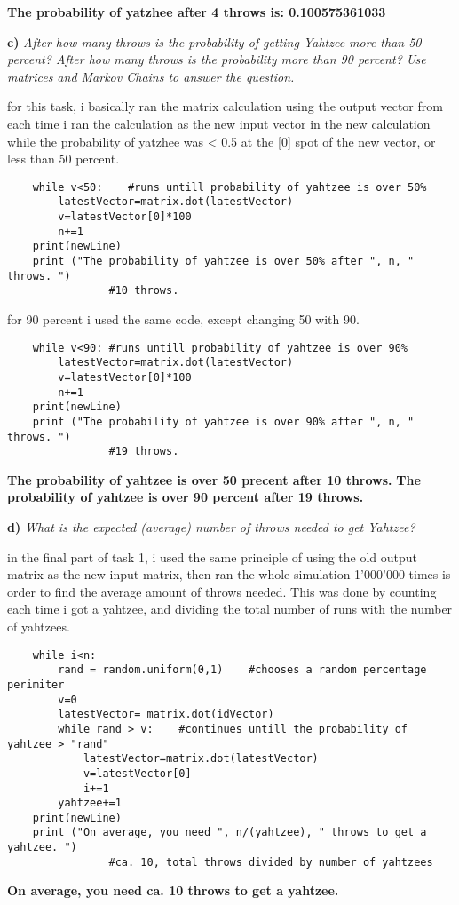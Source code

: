 \documentclass{article}
\begin{document}
\textbf{The probability of yatzhee after 4 throws is: 0.100575361033}

\textbf{c)}
\textit{After how many throws is the probability of getting Yahtzee more
than 50 percent? After how many throws is the probability more than 90 percent?
Use matrices and Markov Chains to answer the question.}
\vspace{10pt}

for this task, i basically ran the matrix calculation using the output vector from each time i ran the calculation as the new input vector in the new calculation while the probability of yatzhee was < 0.5 at the [0] spot of the new vector, or less than 50 percent.

\begin{verbatim}
    while v<50:    #runs untill probability of yahtzee is over 50%
        latestVector=matrix.dot(latestVector)   
        v=latestVector[0]*100
        n+=1
    print(newLine)
    print ("The probability of yahtzee is over 50% after ", n, " throws. ")        
                #10 throws.
\end{verbatim}

for 90 percent i used the same code, except changing 50 with 90.

\begin{verbatim}
    while v<90: #runs untill probability of yahtzee is over 90%
        latestVector=matrix.dot(latestVector)  
        v=latestVector[0]*100
        n+=1
    print(newLine)
    print ("The probability of yahtzee is over 90% after ", n, " throws. ")       
                #19 throws.
\end{verbatim}

\textbf{The probability of yahtzee is over 50 precent after 10 throws.}
\textbf{The probability of yahtzee is over 90 percent after 19 throws.}

\textbf{d)}
\textit{What is the expected (average) number of throws needed to get
Yahtzee?}

in the final part of task 1, i used the same principle of using the old output matrix as the new input matrix, then ran the whole simulation 1'000'000 times is order to find the average amount of throws needed. This was done by counting each time i got a yahtzee, and dividing the total number of runs with the number of yahtzees.

\begin{verbatim}
    while i<n:
        rand = random.uniform(0,1)    #chooses a random percentage perimiter
        v=0
        latestVector= matrix.dot(idVector)
        while rand > v:    #continues untill the probability of yahtzee > "rand"
            latestVector=matrix.dot(latestVector)  
            v=latestVector[0]
            i+=1
        yahtzee+=1                                 
    print(newLine)
    print ("On average, you need ", n/(yahtzee), " throws to get a yahtzee. ")     
                #ca. 10, total throws divided by number of yahtzees
\end{verbatim}
\textbf{On average, you need ca. 10 throws to get a yahtzee.}
\vspace{10pt}
\end{document}
